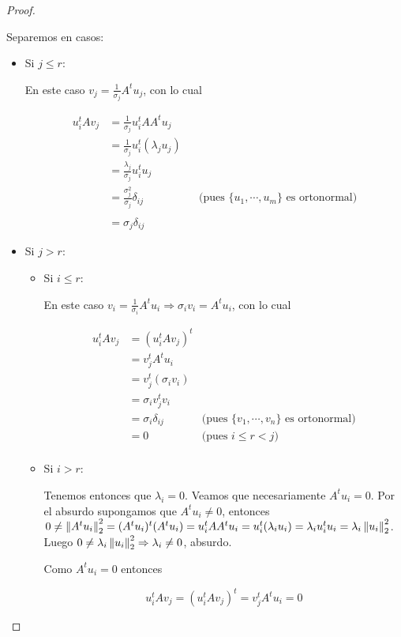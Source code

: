 \begin{teo}
\begin{proof}
\begin{enumerate}
Separemos en casos:

\begin{itemize}
\item Si $j \leq r$:

En este caso $v_j = \frac{1}{\sigma_j}A^t u_j$, con lo cual

\begin{align*}
u_i^t A v_j &= \frac{1}{\sigma_j} u_i^t AA^t u_j				&\\
			&= \frac{1}{\sigma_j} u_i^t (\lambda_j u_j)		&\\
			&= \frac{\lambda_j}{\sigma_j}u_i^t u_j			&\\
			&= \frac{\sigma_j^2}{\sigma_j} \delta_{ij}		&& \text{(pues } \{u_1, \cdots, u_m\} \text{ es ortonormal)} \\\\
			&= \sigma_j \delta_{ij}							&
\end{align*}

\item Si $j > r$:

\begin{itemize}
\item Si $i \leq r$:

En este caso $v_i = \frac{1}{\sigma_i} A^t u_i \Rightarrow \sigma_i v_i = A^t u_i$, con lo cual

\begin{align*}
u_i^t A v_j &= (u_i^t A v_j)^t			& \\
			&= v_j^t A^t u_i				& \\
			&= v_j^t (\sigma_i v_i)		& \\
			&= \sigma_i v_j^t v_i		& \\
			&= \sigma_i \delta_{ij}		& \text{(pues } \{v_1, \cdots, v_n\} \text{ es ortonormal)} \\
			&= 0							& \text{(pues }i \leq r < j \text{)} \\
\end{align*}

\item Si $i > r$:

Tenemos entonces que $\lambda_i = 0$. Veamos que necesariamente $A^t u_i = 0$. Por el absurdo supongamos que $A^t u_i \neq 0$, entonces $0 \neq \left\lVert A^t u_i\right\rVert_2^2 = (A^t u_i)^t(A^t u_i) = u_i^t A A^t u_i = u_i^t (\lambda_i u_i) = \lambda_i u_i^t u_i = \lambda_i \left\lVert u_i\right\rVert_2^2$. Luego $0 \neq \lambda_i \left\lVert u_i\right\rVert_2^2 \Rightarrow \lambda_i \neq 0$, absurdo.

Como $A^t u_i = 0$ entonces

\[u_i^t A v_j = (u_i^t A v_j)^t = v_j^t A^t u_i = 0\]
\end{itemize}
\end{itemize}
\end{enumerate}
\end{proof}
\end{teo}

